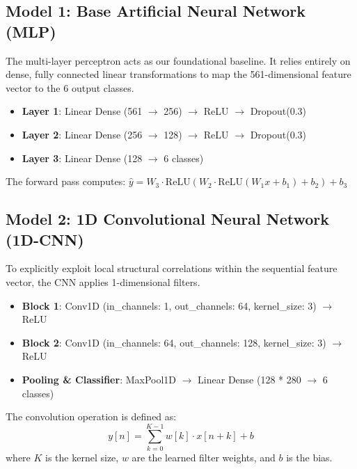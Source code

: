 \documentclass[12pt,a4paper]{article}
\begin{document}
\subsection{Model 1: Base Artificial Neural Network (MLP)}
The multi-layer perceptron acts as our foundational baseline. It relies entirely on dense, fully connected linear transformations to map the 561-dimensional feature vector to the 6 output classes. 
\begin{itemize}
    \item \textbf{Layer 1}: Linear Dense (561 $\rightarrow$ 256) $\rightarrow$ ReLU $\rightarrow$ Dropout(0.3)
    \item \textbf{Layer 2}: Linear Dense (256 $\rightarrow$ 128) $\rightarrow$ ReLU $\rightarrow$ Dropout(0.3)
    \item \textbf{Layer 3}: Linear Dense (128 $\rightarrow$ 6 classes)
\end{itemize}
The forward pass computes: $ \hat{y} = W_3 \cdot \text{ReLU}(W_2 \cdot \text{ReLU}(W_1 x + b_1) + b_2) + b_3 $

\subsection{Model 2: 1D Convolutional Neural Network (1D-CNN)}
To explicitly exploit local structural correlations within the sequential feature vector, the CNN applies 1-dimensional filters.
\begin{itemize}
    \item \textbf{Block 1}: Conv1D (in\_channels: 1, out\_channels: 64, kernel\_size: 3) $\rightarrow$ ReLU
    \item \textbf{Block 2}: Conv1D (in\_channels: 64, out\_channels: 128, kernel\_size: 3) $\rightarrow$ ReLU
    \item \textbf{Pooling \& Classifier}: MaxPool1D $\rightarrow$ Linear Dense (128 * 280 $\rightarrow$ 6 classes)
\end{itemize}
The convolution operation is defined as:
\[ y[n] = \sum_{k=0}^{K-1} w[k] \cdot x[n+k] + b \]
where $K$ is the kernel size, $w$ are the learned filter weights, and $b$ is the bias.
\end{document}
